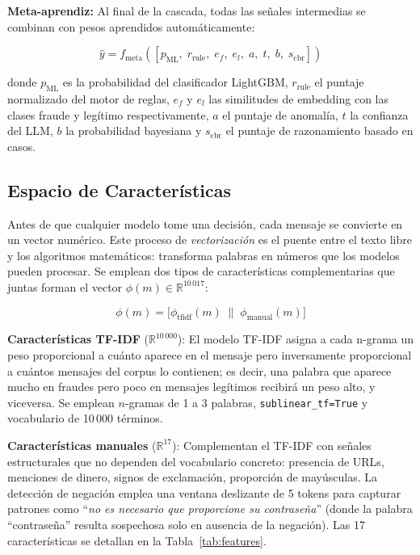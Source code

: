 \documentclass{llncs}
\begin{document}
\textbf{Meta-aprendiz:}
Al final de la cascada, todas las señales intermedias se combinan
con pesos aprendidos automáticamente:

\begin{equation}
  \hat{y} = f_{\mathrm{meta}}\!\left(
    [p_{\mathrm{ML}},\; r_{\mathrm{rule}},\; e_f,\; e_l,\;
     a,\; t,\; b,\; s_{\mathrm{cbr}}]
  \right)
  \label{eq:meta}
\end{equation}

donde $p_{\mathrm{ML}}$ es la probabilidad del clasificador LightGBM,
$r_{\mathrm{rule}}$ el puntaje normalizado del motor de reglas,
$e_f$ y $e_l$ las similitudes de embedding con las clases fraude y
legítimo respectivamente, $a$ el puntaje de anomalía,
$t$ la confianza del LLM, $b$ la probabilidad bayesiana y
$s_{\mathrm{cbr}}$ el puntaje de razonamiento basado en casos.

\subsection{Espacio de Características}
\label{sec:arch:features}

Antes de que cualquier modelo tome una decisión, cada mensaje se
convierte en un vector numérico.
Este proceso de \emph{vectorización} es el puente entre el texto
libre y los algoritmos matemáticos: transforma palabras en números
que los modelos pueden procesar.
Se emplean dos tipos de características complementarias que juntas
forman el vector $\phi(m) \in \mathbb{R}^{10\,017}$:

\begin{equation}
  \phi(m) = \bigl[\phi_{\mathrm{tfidf}}(m) \;\|\; \phi_{\mathrm{manual}}(m)\bigr]
  \label{eq:features}
\end{equation}

\textbf{Características TF-IDF} ($\mathbb{R}^{10\,000}$):
El modelo TF-IDF asigna a cada n-grama un peso proporcional a
cuánto aparece en el mensaje pero inversamente proporcional a
cuántos mensajes del corpus lo contienen; es decir, una palabra
que aparece mucho en fraudes pero poco en mensajes legítimos
recibirá un peso alto, y viceversa.
Se emplean $n$-gramas de 1 a 3 palabras,
\texttt{sublinear\_tf=True} y vocabulario de 10\,000 términos.

\textbf{Características manuales} ($\mathbb{R}^{17}$):
Complementan el TF-IDF con señales estructurales que no dependen
del vocabulario concreto: presencia de URLs, menciones de dinero,
signos de exclamación, proporción de mayúsculas.
La detección de negación emplea una ventana deslizante de 5 tokens
para capturar patrones como
``\emph{no es necesario que proporcione su contraseña}''
(donde la palabra ``contraseña'' resulta sospechosa solo en ausencia
de la negación).
Las 17 características se detallan en la Tabla~\ref{tab:features}.
\end{document}
